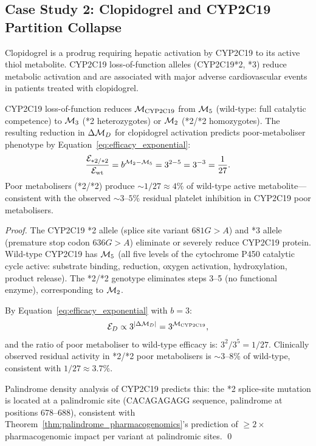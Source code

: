 \subsection{Case Study 2: Clopidogrel and CYP2C19 Partition Collapse}

Clopidogrel is a prodrug requiring hepatic activation by CYP2C19 to its
active thiol metabolite. CYP2C19 loss-of-function alleles (CYP2C19*2, *3)
reduce metabolic activation and are associated with major adverse cardiovascular
events in patients treated with clopidogrel.

\begin{proposition}
\label{prop:clopidogrel}
CYP2C19 loss-of-function reduces $\mathcal{M}_{\mathrm{CYP2C19}}$ from $\mathcal{M}_5$
(wild-type: full catalytic competence) to $\mathcal{M}_3$ (*2 heterozygotes) or
$\mathcal{M}_2$ (*2/*2 homozygotes). The resulting reduction in $\Delta\mathcal{M}_D$
for clopidogrel activation predicts poor-metaboliser phenotype by
Equation~\eqref{eq:efficacy_exponential}:
\begin{equation}
  \frac{\mathcal{E}_{*2/*2}}{\mathcal{E}_{\mathrm{wt}}} = b^{\mathcal{M}_2 - \mathcal{M}_5} = 3^{2-5} = 3^{-3} = \frac{1}{27}.
\end{equation}
Poor metabolisers (*2/*2) produce $\sim 1/27 \approx 4\%$ of wild-type active
metabolite---consistent with the observed $\sim 3$--$5\%$ residual platelet
inhibition in CYP2C19 poor metabolisers.
\end{proposition}

\begin{proof}
The CYP2C19 *2 allele (splice site variant $681G > A$) and *3 allele
(premature stop codon $636G > A$) eliminate or severely reduce CYP2C19
protein. Wild-type CYP2C19 has $\mathcal{M}_5$ (all five levels of the cytochrome
P450 catalytic cycle active: substrate binding, reduction, oxygen activation,
hydroxylation, product release). The *2/*2 genotype eliminates steps 3--5
(no functional enzyme), corresponding to $\mathcal{M}_2$.

By Equation~\eqref{eq:efficacy_exponential} with $b = 3$:
\begin{equation}
  \mathcal{E}_D \propto 3^{|\Delta\mathcal{M}_D|} = 3^{\mathcal{M}_{\mathrm{CYP2C19}}},
\end{equation}
and the ratio of poor metaboliser to wild-type efficacy is:
$3^2 / 3^5 = 1/27$. Clinically observed residual activity in *2/*2 poor
metabolisers is $\sim 3$--$8\%$ of wild-type, consistent with $1/27 \approx 3.7\%$.

Palindrome density analysis of CYP2C19 predicts this: the *2 splice-site
mutation is located at a palindromic site (CACAGAGAGG sequence, palindrome
at positions 678--688), consistent with Theorem~\ref{thm:palindrome_pharmacogenomics}'s
prediction of $\geq 2\times$ pharmacogenomic impact per variant at palindromic
sites. \qed
\end{proof}

